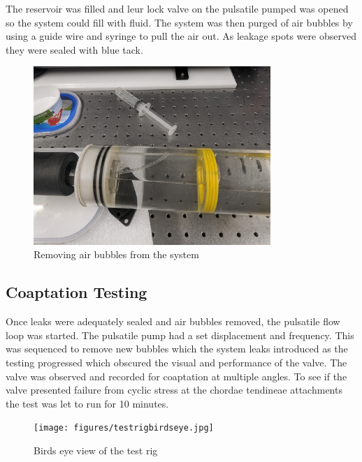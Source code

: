 The reservoir was filled and leur lock valve on the pulsatile pumped was opened so the system could fill with fluid. The system was then purged of air bubbles by using a guide wire and syringe to pull the air out. As leakage spots were observed they were sealed with blue tack.
\begin{figure}
    \centering
    \includegraphics[width=0.8\textwidth]{figures/suckingoutbubbles.jpg}
    \caption{Removing air bubbles from the system}
    \label{fig:leakcheck}
\end{figure}

\subsection{Coaptation Testing}
Once leaks were adequately sealed and air bubbles removed, the pulsatile flow loop was started. The pulsatile pump had a set displacement and frequency.
This was sequenced to remove new bubbles which the system leaks introduced as the testing progressed which obscured the visual and performance of the valve.
The valve was observed and recorded for coaptation at multiple angles.
To see if the valve presented failure from cyclic stress at the chordae tendineae attachments the test was let to run for 10 minutes.
\begin{figure}
    \centering
    \texttt{[image: figures/testrigbirdseye.jpg]}
    \caption{Birds eye view of the test rig}
    \label{fig:rig}
\end{figure}

